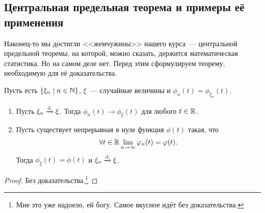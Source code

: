 \subsection{Центральная предельная теорема и примеры её применения}
Наконец-то мы достигли <<жемчужины>> нашего курса~--- центральной предельной теоремы, на которой, можно сказать, держится математическая статистика. Но на самом деле нет. Перед этим сформулируем теорему, необходимую для её доказательства.
\begin{theorem}[непрерывности]
	Пусть есть \(\{\xi_{n} \mid n \in \mathbb{N}\}\), \(\xi\)~--- случайные величины и \(\phi_{n}(t) = \phi_{\xi_n}(t)\).
	\begin{enumerate}
		\item Пусть \(\xi_{n} \xrightarrow{\mathrm{d}} \xi\). Тогда \(\phi_{n}(t) \to \phi_{\xi}(t)\) для любого \(t \in \mathbb{R}\).
		\item Пусть существует непрерывная в нуле функция \(\phi(t)\) такая, что
		\[
			\forall t \in \mathbb{R} \lim\limits_{n \to \infty} \varphi_{n}(t) = \varphi(t).
		\]
		Тогда \(\phi_{\xi}(t) = \phi(t)\) и \(\xi_{n} \xrightarrow{\mathrm{d}} \xi\).
	\end{enumerate}
\end{theorem}
\begin{proof}
	Без доказательства.\footnote{Мне это уже надоело, ей богу. Самое вкусное идёт без доказательства.}
\end{proof}

